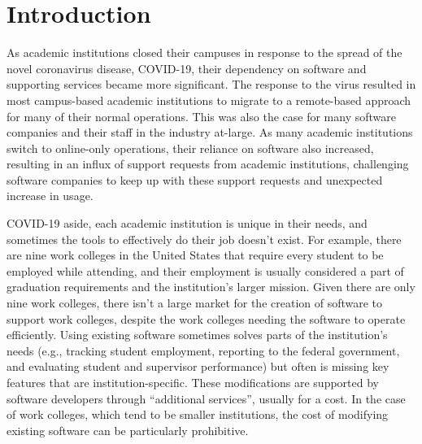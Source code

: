 \section{Introduction}


As academic institutions closed their campuses in response to the spread of the novel coronavirus disease, COVID-19, their dependency on software and supporting services became more significant. The response to the virus resulted in most campus-based academic institutions to migrate to a remote-based approach for many of their normal operations. This was also the case for many software companies and their staff in the industry at-large. As many academic institutions switch to online-only operations, their reliance on software also increased, resulting in an influx of support requests from academic institutions, challenging software companies to keep up with these support requests and unexpected increase in usage.

COVID-19 aside, each academic institution is unique in their needs, and sometimes the tools to effectively do their job doesn't exist. For example, there are nine work colleges in the United States \cite{WCCMembers, Ecclesia} that require every student to be employed while attending, and their employment is usually considered a part of graduation requirements and the institution's larger mission. Given there are only nine work colleges, there isn't a large market for the creation of software to support work colleges, despite the work colleges needing the software to operate efficiently. Using existing software sometimes solves parts of the institution's needs (e.g., tracking student employment, reporting to the federal government, and evaluating student and supervisor performance) but often is missing key features that are institution-specific. These modifications are supported by software developers through ``additional services”, usually for a cost. In the case of work colleges, which tend to be smaller institutions, the cost of modifying existing software can be particularly prohibitive.

